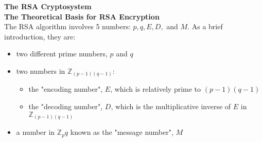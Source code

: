\documentclass{article}
\begin{document}
\begin{flushleft}
    \LARGE\textbf{The RSA Cryptosystem}\normalsize\\ \vspace{11pt}
    \textbf{The Theoretical Basis for RSA Encryption}\\
    The RSA algorithm involves 5 numbers: $p, q, E, D,$ and $M$. As a brief introduction, they are:
    \begin{itemize}
        \item two different prime numbers, $p$ and $q$
        \item two numbers in $\mathbb{Z}_{(p-1)(q-1)}$:
              \begin{itemize}
                  \item the "encoding number", $E$, which is relatively prime to $(p-1)(q-1)$
                  \item the "decoding number", $D$, which is the multiplicative inverse of $E$ in $\mathbb{Z}_{(p-1)(q-1)}$
              \end{itemize}
        \item a number in $\mathbb{Z}_pq$ known as the "message number", $M$
    \end{itemize}
\end{flushleft}
\end{document}
